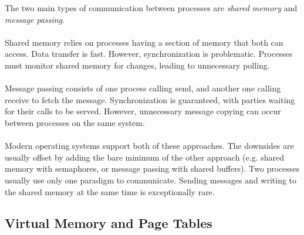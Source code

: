 The two main types of communication between processes are \emph{shared memory} 
and \emph{message passing}\cite{silberschatz2018operating}.
\\
\\
Shared memory relies on processes having a section of memory that both can 
access. Data transfer is fast. However, synchronization is problematic. 
Processes must monitor shared memory for changes, leading to unnecessary
polling.
\\
\\
Message passing consists of one process calling send, and another one calling
receive to fetch the message. Synchronization is guaranteed, with parties
waiting for their calls to be served. However, unnecessary message copying can
occur between processes on the same system.
\\
\\
Modern operating systems support both of these approaches. The downsides are
usually offset by adding the  bare minimum of the other approach (e.g. shared
memory with semaphores, or message passing with shared buffers). Two processes
usually use only one paradigm to communicate. Sending messages and writing
to the shared memory at the same time is exceptionally rare.

\subsection{Virtual Memory and Page Tables} \label{sec:vm}

